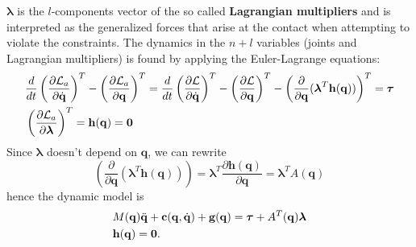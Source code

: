 \documentclass[10pt, a4paper]{report}
\newcommand{\q}{{\mathbf q}}
\begin{document}
$\boldsymbol{\lambda}$ is the $l$-components vector of the so called \textbf{Lagrangian multipliers} and is interpreted as the generalized  forces that arise at the contact when attempting to violate the constraints. The dynamics in the $n+l$ variables (joints and Lagrangian multipliers) is found by applying the Euler-Lagrange equations:\begin{align}
    &\frac{d}{dt}\left(\frac{\partial\mathcal L_a}{\partial\dq}\right)^T-\left(\frac{\partial\mathcal L_a}{\partial\q}\right)^T=
    \frac{d}{dt}\left(\frac{\partial\mathcal L}{\partial\dq}\right)^T-\left(\frac{\partial\mathcal L}{\partial\q}\right)^T-\left(
        \frac{\partial}{\partial \q}(\boldsymbol{\lambda}^T\mathbf h(\q))
    \right)^T=\btau
    \\
    &\left(\frac{\partial\mathcal L_a}{\partial\boldsymbol{\lambda}}\right)^T=\mathbf h(\q)=\mathbf 0
\end{align}
Since $\boldsymbol{\lambda}$ doesn't depend on $\q$, we can rewrite\begin{equation}
    \left(
        \frac{\partial}{\partial \q}(\boldsymbol{\lambda}^T\mathbf h(\q))
    \right)=\boldsymbol{\lambda}^T\frac{\partial\mathbf h(\q)}{\partial \q}=\boldsymbol{\lambda}^TA(\q)
\end{equation}
hence the dynamic model is\begin{align}
    &M(\q)\ddq+\mathbf c(\q,\dq)+\mathbf g(\q)=\btau+A^T(\q)\boldsymbol{\lambda}\label{constrained_dyn}\\
    &\mathbf h(\q)=\mathbf 0. 
\end{align}
\end{document}
